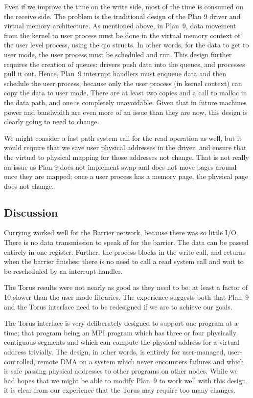 \documentclass[a4,10pt,preprint]{sigplanconf}
\begin{document}
Even if we improve the time on the write side, most of the time is consumed on the receive side. 
The problem is the traditional design of the Plan 9 driver and virtual memory architecture. As mentioned above, in Plan~9, data movement from the kernel to user process must be done in the virtual memory context of the user level process, using the qio structs. In other words, for the data to get to user mode, the user process must be scheduled and run. This design further requires the creation of queues: drivers push data into the queues, and processes pull it out. Hence, Plan~9 interrupt handlers must enqueue data and then schedule the user process, because only the user process (in kernel context) can copy the data to user mode. There are at least two copies and a call to malloc in the data path, and one is completely unavoidable. Given that in future machines power and bandwidth are even more of an issue than they are now, this design is clearly going to need to change. 

We might consider a fast path system call for the read operation as well, but it would require that we save user physical addresses in the driver, and ensure that the virtual 
to physical mapping for those addresses not change. That is not really an issue as Plan 9 does not implement swap and does not move pages around once they are mapped; once a user process has a memory page, the physical page does not change. 

\subsection{Discussion}
Currying worked well for the Barrier network, because there was so little I/O. There is no data transmission to speak of for the barrier. The data can be passed entirely in one register. Further, the process blocks in the write call, and returns when the barrier finishes; there is no need to call a read system call and wait to be rescheduled by an interrupt handler. 

The Torus results were not nearly as good as they need to be: at least a factor of 10 slower than the user-mode libraries. 
The experience suggests both that Plan~9 and the Torus interface need to be redesigned if we are to achieve our goals. 

The Torus interface is very deliberately designed to support one program at a time; that program being an MPI program which has three or four physically contiguous segments and which can compute the physical address for a virtual address trivially. The design, in other words, is entirely for user-managed, user-controlled, remote DMA on a system which never encounters failures and which is safe passing physical addresses to other programs on other nodes. While we had hopes that we might be able to modify Plan~9 to work well with this design, it is clear from our experience that the Torus may require too many changes. 
\end{document}
